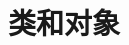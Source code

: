 \documentclass[cs4size,a4paper,nofonts]{ctexart}
\begin{document}


\part{类和对象}
 \clearpage
 \clearpage
 \clearpage
\end{document}
